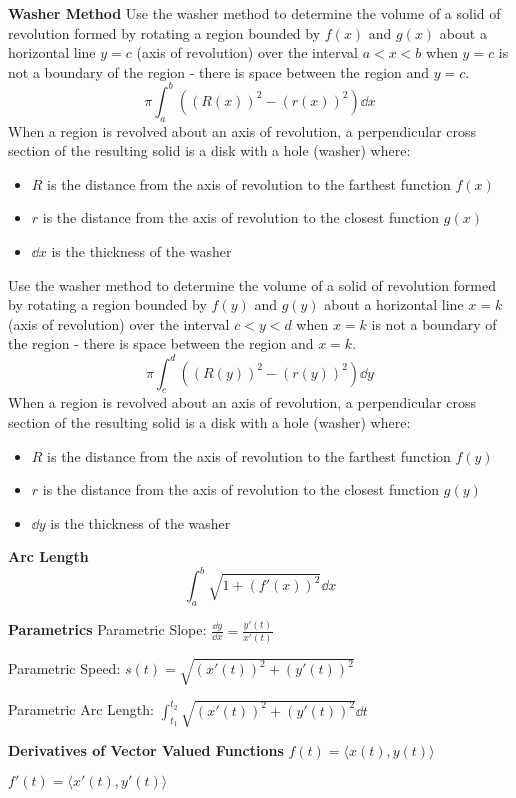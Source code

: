 \documentclass[10pt,a4paper,oneside]{book}
\begin{document}
\textbf{Washer Method}
Use the washer method to determine the volume of a solid of revolution formed by rotating a region bounded by $f(x)$ and $g(x)$ about a horizontal line $y=c$ (axis of revolution) over the interval 
$a<x<b$ when $y=c$ is not a boundary of the region - there is space between the region and $y=c$.
\[ \pi \int_a^b ((R(x))^2 - (r(x))^2)\dd x \]
When a region is revolved about an axis of revolution, a perpendicular cross section of the resulting solid is a disk with a hole (washer) where:
\begin{itemize}
    \item $R$ is the distance from the axis of revolution to the farthest function $f(x)$ 
    \item $r$ is the distance from the axis of revolution to the closest function $g(x)$
    \item $\dd x$ is the thickness of the washer 
\end{itemize}

Use the washer method to determine the volume of a solid of revolution formed by rotating a region bounded by $f(y)$ and $g(y)$ about a horizontal line $x=k$ (axis of revolution) over the interval 
$c<y<d$ when $x=k$ is not a boundary of the region - there is space between the region and $x=k$.
\[ \pi \int_c^d ((R(y))^2 - (r(y))^2)\dd y \]
When a region is revolved about an axis of revolution, a perpendicular cross section of the resulting solid is a disk with a hole (washer) where:
\begin{itemize}
    \item $R$ is the distance from the axis of revolution to the farthest function $f(y)$ 
    \item $r$ is the distance from the axis of revolution to the closest function $g(y)$
    \item $\dd y$ is the thickness of the washer 
\end{itemize}

\textbf{Arc Length}
\[ \int_a^b \sqrt{1+(f'(x))^2}\dd x\]

\textbf{Parametrics}
Parametric Slope: $\frac{\dd y}{\dd x}=\frac{y'(t)}{x'(t)}$

Parametric Speed: $s(t)=\sqrt{(x'(t))^2+(y'(t))^2}$

Parametric Arc Length: $\int_{t_1}^{t_2}\sqrt{(x'(t))^2+(y'(t))^2}\dd t$

\textbf{Derivatives of Vector Valued Functions}
$f(t)=\langle x(t), y(t)\rangle$

$f'(t) = \langle x'(t),y'(t)\rangle$
\end{document}
